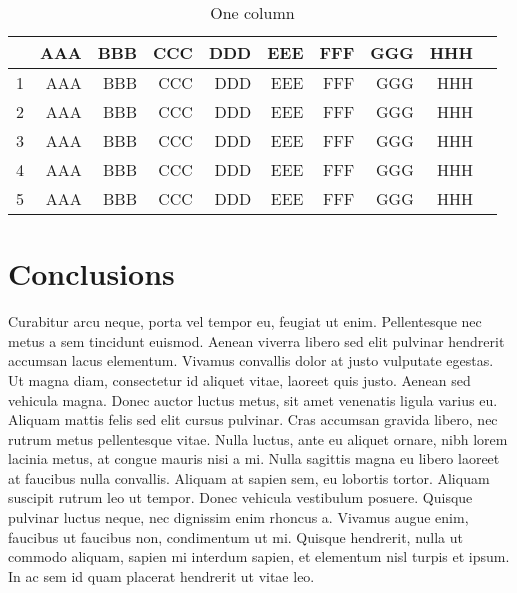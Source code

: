 \documentclass{genos-technical-report}
\begin{document}
\begin{table*}
  \centering
  \begin{tabular}{l|rrrrrrrrr}
    & AAA & BBB & CCC & DDD & EEE & FFF & GGG & HHH \\
    \hline
    1 & AAA & BBB & CCC & DDD & EEE & FFF & GGG & HHH \\
    2 & AAA & BBB & CCC & DDD & EEE & FFF & GGG & HHH \\
    3 & AAA & BBB & CCC & DDD & EEE & FFF & GGG & HHH \\
    4 & AAA & BBB & CCC & DDD & EEE & FFF & GGG & HHH \\
    5 & AAA & BBB & CCC & DDD & EEE & FFF & GGG & HHH \\
  \end{tabular}
  \caption{One column}
  \label{tab:one}
\end{table*}

\section{Conclusions}
\label{sec:conclusions}

Curabitur arcu neque, porta vel tempor eu, feugiat ut
enim. Pellentesque nec metus a sem tincidunt euismod. Aenean viverra
libero sed elit pulvinar hendrerit accumsan lacus elementum. Vivamus
convallis dolor at justo vulputate egestas. Ut magna diam, consectetur
id aliquet vitae, laoreet quis justo. Aenean sed vehicula magna. Donec
auctor luctus metus, sit amet venenatis ligula varius eu. Aliquam
mattis felis sed elit cursus pulvinar. Cras accumsan gravida libero,
nec rutrum metus pellentesque vitae. Nulla luctus, ante eu aliquet
ornare, nibh lorem lacinia metus, at congue mauris nisi a mi. Nulla
sagittis magna eu libero laoreet at faucibus nulla convallis. Aliquam
at sapien sem, eu lobortis tortor. Aliquam suscipit rutrum leo ut
tempor. Donec vehicula vestibulum posuere. Quisque pulvinar luctus
neque, nec dignissim enim rhoncus a. Vivamus augue enim, faucibus ut
faucibus non, condimentum ut mi. Quisque hendrerit, nulla ut commodo
aliquam, sapien mi interdum sapien, et elementum nisl turpis et
ipsum. In ac sem id quam placerat hendrerit ut vitae leo.

\nocite{sampaio.ea10:musicontour}



\end{document}
